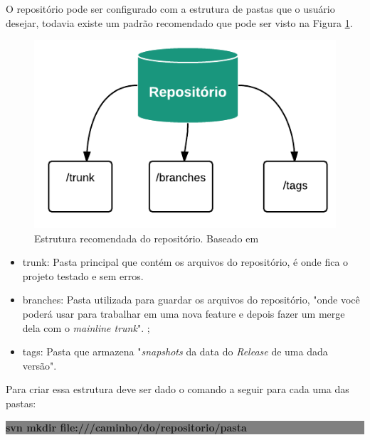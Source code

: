 O repositório pode ser configurado com a estrutura de pastas que o usuário desejar, todavia existe um padrão recomendado que pode ser visto na Figura
\ref{fig:estrutura_repo}.

\begin{figure}[!htb]
\centering
\includegraphics[scale=1]{figuras/estrutura_repo.png}
\caption{Estrutura recomendada do repositório. Baseado em \cite{svn-book}}
\label{fig:estrutura_repo}
\end{figure}

\begin{itemize}
  \item trunk: Pasta principal que contém os arquivos do repositório, é onde fica o projeto testado e sem erros. \cite{wiki-svn}

  \item branches: Pasta utilizada para guardar os arquivos do repositório, "onde você poderá usar para trabalhar em uma nova feature e depois fazer um merge dela com o \textit{mainline trunk}". \cite{wiki-svn};

  \item tags: Pasta que armazena "\textit{snapshots} da data do \textit{Release} de uma dada versão". \cite{wiki-svn}
\end{itemize}

Para criar essa estrutura deve ser dado o comando a seguir para cada uma das pastas: \cite{wiki-svn}

\begin{centering}

\colorbox{Gray}{
\begin{minipage}{280px}
  \textbf{svn mkdir file:///caminho/do/repositorio/pasta}
\end{minipage}
}

\end{centering}

